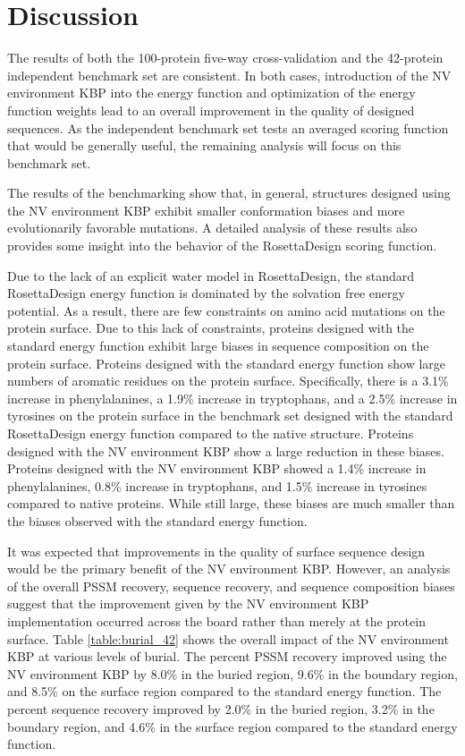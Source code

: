 \section{Discussion}

The results of both the 100-protein five-way cross-validation and the 42-protein independent benchmark set are consistent.
In both cases, introduction of the NV environment KBP into the energy function and optimization of the energy function weights lead to an overall improvement in the quality of designed sequences.
As the independent benchmark set tests an averaged scoring function that would be generally useful, the remaining analysis will focus on this benchmark set. 

The results of the benchmarking show that, in general, structures designed using the NV environment KBP exhibit smaller conformation biases and more evolutionarily favorable mutations.
A detailed analysis of these results also provides some insight into the behavior of the RosettaDesign scoring function.

Due to the lack of an explicit water model in RosettaDesign, the standard RosettaDesign energy function is dominated by the solvation free energy potential.
As a result, there are few constraints on amino acid mutations on the protein surface.
Due to this lack of constraints, proteins designed with the standard energy function exhibit large biases in sequence composition on the protein surface.
Proteins designed with the standard energy function show large numbers of aromatic residues on the protein surface.
Specifically, there is a 3.1\% increase in phenylalanines, a 1.9\% increase in tryptophans, and a 2.5\% increase in tyrosines on the protein surface in the benchmark set designed with the standard RosettaDesign energy function compared to the native structure.
Proteins designed with the NV environment KBP show a large reduction in these biases.
Proteins designed with the NV environment KBP showed a 1.4\% increase in phenylalanines, 0.8\% increase in tryptophans, and 1.5\% increase in tyrosines compared to native proteins.
While still large, these biases are much smaller than the biases observed with the standard energy function. 

It was expected that improvements in the quality of surface sequence design would be the primary benefit of the NV environment KBP.
However, an analysis of the overall PSSM recovery, sequence recovery, and sequence composition biases suggest that the improvement given by the NV environment KBP implementation occurred across the board rather than merely at the protein surface.
Table \ref{table:burial_42} shows the overall impact of the NV environment KBP at various levels of burial.
The percent PSSM recovery improved using the NV environment KBP by 8.0\% in the buried region, 9.6\% in the boundary region, and 8.5\% on the surface region compared to the standard energy function.
The percent sequence recovery improved by 2.0\% in the buried region, 3.2\% in the boundary region, and 4.6\% in the surface region compared to the standard energy function.
 
